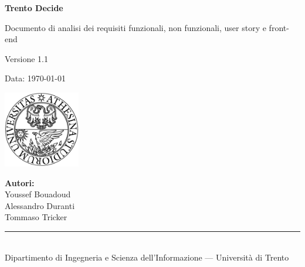 \documentclass[12pt,a4paper]{report}
\begin{document}
\begin{titlepage}
  \centering

  {\Huge\bfseries Trento Decide \par}
  \vspace{1cm}

  {\Large Documento di analisi dei requisiti funzionali, non funzionali, user story e front-end \par}
  \vspace{1.5cm}

  {\large Versione 1.1 \par}
  \vspace{0.5cm}

  {\large Data: \today \par}
  \vspace{3.5cm}

  \includegraphics[width=0.25\textwidth]{img/unitn.png}

  \vfill

  \begin{flushright}
    \textbf{Autori:}\\[0.3em]
    Youssef Bouadoud\\
    Alessandro Duranti\\
    Tommaso Tricker
  \end{flushright}

  \vspace{1cm}
  \rule{\textwidth}{0.4pt}\\[0.3em]
  {\small Dipartimento di Ingegneria e Scienza dell'Informazione — Università di Trento}
\end{titlepage}

\tableofcontents
\newpage





\end{document}
